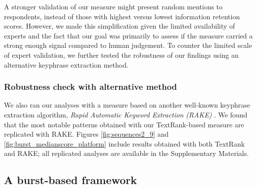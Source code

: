 \documentclass[letterpaper]{article} %
\begin{document}
A stronger validation of our measure might present random mentions to respondents, instead of those with highest versus lowest information retention scores. However, we made this simplification given the limited availability of experts and the fact that our goal was primarily to assess if the measure carried a strong enough signal compared to human judgement. To counter the limited scale of expert validation, we further tested the robustness of our findings using an alternative keyphrase extraction method.

\subsubsection{Robustness check with alternative method} We also ran our analyses with a measure based on another well-known keyphrase extraction algorithm, {\emph{Rapid Automatic Keyword Extraction (RAKE)}} \cite{roseAutomaticKeywordExtraction2010}. We found that the most notable patterns obtained with our TextRank-based measure are replicated with RAKE. Figures \ref{fig:sequences2_9} and \ref{fig:burst_medianscore_platform} include results obtained with both TextRank and RAKE; all replicated analyses are available in the Supplementary Materials.

\subsection{A burst-based framework}
\end{document}
